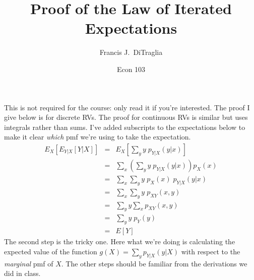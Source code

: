 \documentclass[12pt]{article}
\title{Proof of the Law of Iterated Expectations}
\author{Francis J.\ DiTraglia}
\date{Econ 103}
\begin{document}
\maketitle

\noindent This is not required for the course: only read it if you're interested. The proof I give below is for discrete RVs. The proof for continuous RVs is similar but uses integrals rather than sums. I've added subscripts to the expectations below to make it clear \emph{which} pmf we're using to take the expectation.
\begin{eqnarray*}
	E_X\left[ E_{Y|X}\left[Y|X\right] \right] &=&E_X\left[ \sum_y y \; p_{Y|X}(y|x)\right]\\
		&=& \sum_x \left( \sum_y y \; p_{Y|X}(y|x)\right) p_X(x) \\
		&=& \sum_x \sum_y y \; p_X(x) \; p_{Y|X}(y|x)\\
		&=& \sum_x \sum_y y \; p_{XY}(x,y)\\
		&=& \sum_y y \sum_x p_{XY}(x,y)\\
		&=& \sum_y y \;p_Y(y)\\
		&=& E[Y]
\end{eqnarray*}
The second step is the tricky one. Here what we're doing is calculating the expected value of the function $g(X) = \sum_y p_{Y|X}(y|X)$ with respect to the \emph{marginal} pmf of $X$. The other steps should be familiar from the derivations we did in class.
\end{document}
